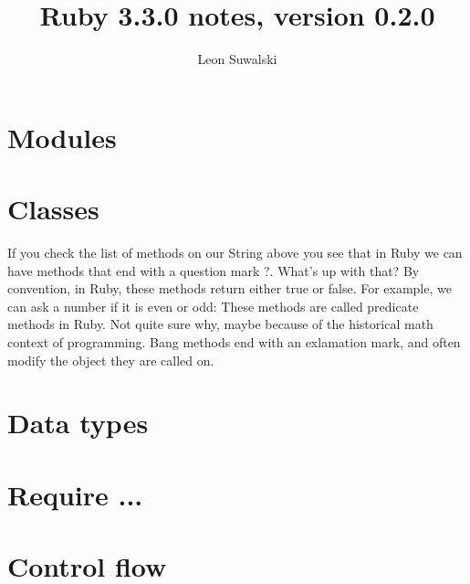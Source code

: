 \documentclass{a5charun}
\title{Ruby 3.3.0 notes, version 0.2.0}
\author{Leon Suwalski}
\begin{document}
\maketitle

\section{Modules}


\section{Classes}



\newpage

If you check the list of methods on our String above you see that in Ruby we can have methods that end with a question mark ?. What’s up with that?
By convention, in Ruby, these methods return either true or false. For example, we can ask a number if it is even or odd:
These methods are called predicate methods in Ruby. Not quite sure why, maybe because of the historical math context of programming.
Bang methods end with an exlamation mark, and often modify the object they are called on. 


\section{Data types}







\section{Require ...}


\section{Control flow}


\end{document}

